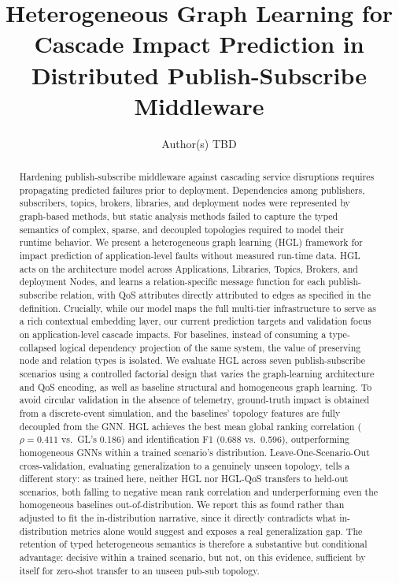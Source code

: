 \documentclass[review]{elsarticle}
\begin{document}
\begin{frontmatter}

\title{Heterogeneous Graph Learning for Cascade Impact Prediction in Distributed Publish-Subscribe Middleware}

\author{Author(s) TBD}
\address{Institution(s) TBD}

\begin{abstract}
Hardening publish-subscribe middleware against cascading service disruptions requires propagating
predicted failures prior to deployment. Dependencies among publishers, subscribers, topics,
brokers, libraries, and deployment nodes were represented by graph-based methods, but static
analysis methods failed to capture the typed semantics of complex, sparse, and decoupled
topologies required to model their runtime behavior. We present a heterogeneous graph learning
(HGL) framework for impact prediction of application-level faults without measured run-time data.
HGL acts on the architecture model across Applications, Libraries, Topics, Brokers, and deployment
Nodes, and learns a relation-specific message function for each publish-subscribe relation, with
QoS attributes directly attributed to edges as specified in the definition. Crucially, while our
model maps the full multi-tier infrastructure to serve as a rich contextual embedding layer, our
current prediction targets and validation focus on application-level cascade impacts. For
baselines, instead of consuming a type-collapsed logical dependency projection of the same system,
the value of preserving node and relation types is isolated. We evaluate HGL across seven
publish-subscribe scenarios using a controlled factorial design that varies the graph-learning
architecture and QoS encoding, as well as baseline structural and homogeneous graph learning. To
avoid circular validation in the absence of telemetry, ground-truth impact is obtained from a
discrete-event simulation, and the baselines' topology features are fully decoupled from the GNN.
HGL achieves the best mean global ranking correlation ($\rho=0.411$ vs.\ GL's 0.186) and
identification F1 (0.688 vs.\ 0.596), outperforming homogeneous GNNs within a trained scenario's
distribution. Leave-One-Scenario-Out cross-validation, evaluating generalization to a genuinely
unseen topology, tells a different story: as trained here, neither HGL nor HGL-QoS transfers to
held-out scenarios, both falling to negative mean rank correlation and underperforming even the
homogeneous baselines out-of-distribution. We report this as found rather than adjusted to fit the
in-distribution narrative, since it directly contradicts what in-distribution metrics alone would
suggest and exposes a real generalization gap. The retention of typed heterogeneous semantics is
therefore a substantive but conditional advantage: decisive within a trained scenario, but not, on
this evidence, sufficient by itself for zero-shot transfer to an unseen pub-sub topology.
\end{abstract}


\end{frontmatter}
\end{document}
